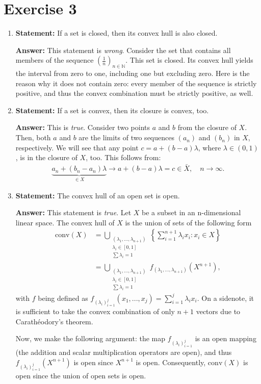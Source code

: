 \documentclass{article}
\begin{document}
\section*{Exercise 3}
\begin{enumerate}[label=(\alph*)]
    \item \textbf{Statement:} If a set is closed, then its convex hull is also closed.

    \textbf{Answer:} This statement is \emph{wrong}. Consider the set that contains all members of the sequence $(\frac{1}{n})_{n \in \mathbb N}$. This set is closed. Its convex hull yields the interval from zero to one, including one but excluding zero. Here is the reason why it does not contain zero: every member of the sequence is strictly positive, and thus the convex combination must be strictly positive, as well.

    \item \textbf{Statement:} If a set is convex, then its closure is convex, too.
    
    \textbf{Answer:} This is \emph{true}. Consider two points $a$ and $b$ from the closure of $X$. Then, both $a$ and $b$ are the limits of two sequences $(a_n)$ and $(b_n)$ in $X$, respectively. We will see that any point $c = a + (b-a) \lambda$, where $\lambda \in (0,1)$, is in the closure of $X$, too. This follows from:
    \begin{align*}
        \underbrace{a_n + (b_n - a_n) \lambda}_{\in X} \to a + (b - a) \lambda = c \in \bar X, \quad n \to \infty.
    \end{align*}

    \item \textbf{Statement:} The convex hull of an open set is open.

    \textbf{Answer:} This statement is \emph{true}. Let $X$ be a subset in an n-dimensional linear space. The convex hull of $X$ is the union of sets of the following form
    \begin{align*}
        \mathrm{conv}(X) &= \bigcup_{\substack{(\lambda_1,...,\lambda_{n+1})\\ \lambda_i \in [0,1] \\ \sum \lambda_i = 1}} \left\{ \sum^{n+1}_{i=1} \lambda_i x_i : x_i \in X \right\} \\
       &= \bigcup_{\substack{(\lambda_1,...,\lambda_{n+1})\\ \lambda_i \in [0,1] \\ \sum \lambda_i = 1}} f_{(\lambda_1,...,\lambda_{n+1})}(X^{n+1}),
    \end{align*}
    with $f$ being defined as $f_{(\lambda_i)_{i=1}^j}(x_1,...,x_j) = \sum^j_{i=1}\lambda_i x_i$. On a sidenote, it is sufficient to take the convex combination of only $n+1$ vectors due to Carathéodory's theorem.
    
    Now, we make the following argument: the map $f_{(\lambda_i)_{i=1}^j}$ is an open mapping (the addition and scalar multiplication operators are open), and thus $f_{(\lambda_i)_{i=1}^j}(X^{n+1})$ is open since $X^{n+1}$ is open. Consequently, $\mathrm{conv}(X)$ is open since the union of open sets is open. 
\end{enumerate}
\end{document}
